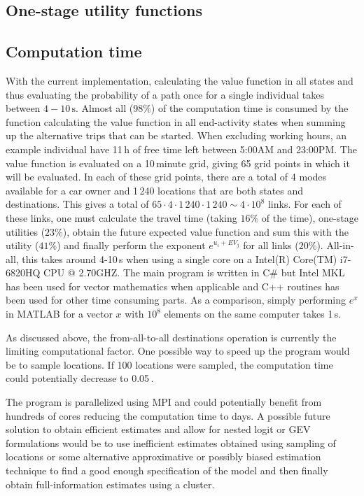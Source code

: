 \subsection{One-stage utility functions}

\subsection{Computation time}\label{seq:computationTime}
\newcommand{\zdel }{\,}
\newcommand{\units}[1]{\,\text{#1}}
With the current implementation, calculating the value function in all states and thus evaluating the probability of a path once for a single individual takes between $4-10\units{s}$. Almost all ($98\%$) of the computation time is consumed by the function calculating the value function in all end-activity states when summing up the alternative trips that can be started. When excluding working hours, an example individual have 11\,h of free time left between 5:00AM and 23:00PM. The value function is evaluated on a 10\,minute grid, giving 65 grid points in which it will be evaluated. In each of these grid points, there are a total of 4 modes available for a car owner and 1\zdel 240 locations that are both states and destinations. This gives a total of $65 \cdot 4 \cdot 1\zdel 240 \cdot 1\zdel 240 \sim 4 \cdot 10^8$ links. For each of these links, one must calculate the travel time (taking $16\%$ of the time), one-stage utilities ($23\%$), obtain the future expected value function and sum this with the utility ($41\%$) and finally perform the exponent $e^{u_i + EV_j}$ for all links ($20\%$). All-in-all, this takes around 4-10\,s when using a single core on a Intel(R) Core(TM) i7-6820HQ CPU @ 2.70GHZ. The main program is written in C\# but Intel MKL has been used for vector mathematics when applicable and C++ routines has been used for other time consuming parts. As a comparison, simply performing $e^x$ in MATLAB for a vector $x$ with $10^8$ elements on the same computer takes 1\,s. 

As discussed above, the from-all-to-all destinations operation is currently the limiting computational factor. One possible way to speed up the program would be to sample locations. If 100 locations were sampled, the computation time could potentially decrease to 0.05\units{s/individual}.  

The program is parallelized using MPI and could potentially benefit from hundreds of cores reducing the computation time to days. A possible future solution to obtain efficient estimates and allow for nested logit or GEV formulations would be to use inefficient estimates obtained using sampling of locations or some alternative approximative or possibly biased estimation technique to find a good enough specification of the model and then finally obtain full-information estimates using a cluster. 